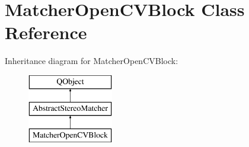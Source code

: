 \hypertarget{class_matcher_open_c_v_block}{}\section{Matcher\+Open\+C\+V\+Block Class Reference}
\label{class_matcher_open_c_v_block}
Inheritance diagram for Matcher\+Open\+C\+V\+Block\+:\begin{figure}[H]
\begin{center}
\leavevmode
\includegraphics[height=3.000000cm]{class_matcher_open_c_v_block}
\end{center}
\end{figure}
